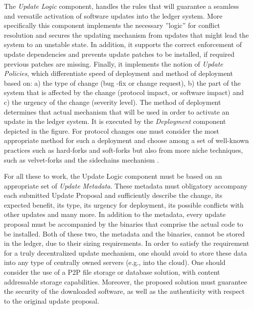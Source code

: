 The \emph{Update Logic} component, handles the rules that will guarantee a seamless and versatile activation of software updates into the ledger system. More specifically this component implements the necessary ''logic'' for conflict resolution and secures the updating mechanism from updates that might lead the system to an unstable state. In addition, it supports the correct enforcement of update dependencies and prevents update patches to be installed, if required previous patches are missing. Finally, it implements the notion of \emph{Update Policies}, which differentiate speed of deployment and method of deployment based on: a) the type of change (bug -fix or change request), b) the part of the system that is affected by the change (protocol impact, or software impact) and c) the urgency of the change (severity level). The method of deployment determines that actual mechanism that will be used in order to activate an update in the ledger system. It is executed by the \emph{Deployment} component depicted in the figure. For protocol changes one must consider the most appropriate method for such a deployment and choose among a set of well-known practices such as hard-forks and soft-forks but also from more niche techniques, such as velvet-forks \cite{velvet} and the sidechains mechanism \cite{sidechains}.

For all these to work, the Update Logic component must be based on an appropriate set of \emph{Update Metadata}. These metadata must obligatory accompany each submitted Update Proposal and sufficiently describe the change, its expected benefit, its type, its urgency for deployment, its possible conflicts with other updates and many more. In addition to the metadata, every update proposal must be accompanied by the binaries that comprise the actual code to be installed. Both of these two, the metadata and the binaries, cannot be stored in the ledger, due to their sizing requirements. In order to satisfy the requirement for a truly decentralized update mechanism, one should avoid to store these data into any type of centrally owned servers (e.g., into the cloud). One should consider the use of a P2P file storage or database solution, with content addressable storage capabilities. Moreover, the proposed solution  must guarantee the security of the downloaded software, as well as the authenticity with respect to the original update proposal.

